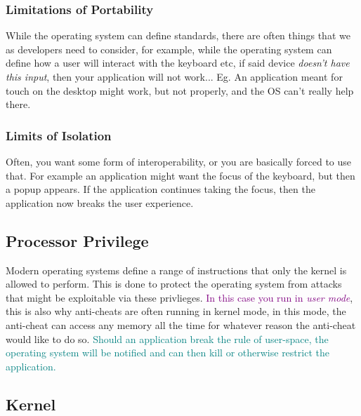 \documentclass[main.tex,fontsize=8pt,paper=a4,paper=portrait,DIV=calc,]{scrartcl}
\begin{document}
\subsubsection{Limitations of Portability}
While the operating system can define standards, there are often things that we as developers need to consider,
for example, while the operating system can define how a user will interact with the keyboard etc, if said device \emph{doesn't have this input},
then your application will not work... Eg. An application meant for touch on the desktop might work, but not properly, and the OS can't really help there. 

\subsubsection{Limits of Isolation}
Often, you want some form of interoperability, or you are basically forced to use that.\newline
For example an application might want the focus of the keyboard, but then a popup appears.\newline
If the application continues taking the focus, then the application now breaks the user experience. 

\subsection{Processor Privilege}
Modern operating systems define a range of instructions that only the kernel is allowed to perform.\newline
This is done to protect the operating system from attacks that might be exploitable via these privlieges.\newline
\textcolor{purple}{In this case you run in \emph{user mode}}, this is also why anti-cheats are often running in kernel mode,\newline
in this mode, the anti-cheat can access any memory all the time for whatever reason the anti-cheat would like to do so. \newline
\textcolor{teal}{Should an application break the rule of user-space, the operating system will be notified and can then kill or otherwise restrict the application.}

\subsection{Kernel}
\end{document}
